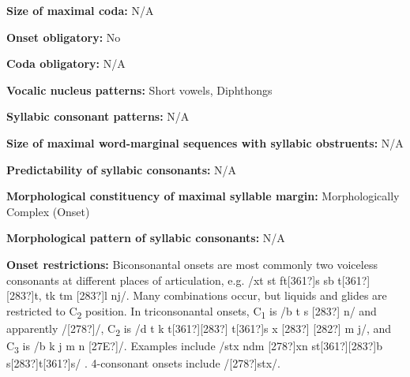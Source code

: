 \begin{styleBody}
\textbf{Size of maximal coda:} N/A
\end{styleBody}

\begin{styleBody}
\textbf{Onset obligatory:} No
\end{styleBody}

\begin{styleBody}
\textbf{Coda obligatory:} N/A
\end{styleBody}

\begin{styleBody}
\textbf{Vocalic nucleus patterns:} Short vowels, Diphthongs
\end{styleBody}

\begin{styleBody}
\textbf{Syllabic consonant patterns:} N/A
\end{styleBody}

\begin{styleBody}
\textbf{Size of maximal word{}-marginal sequences with syllabic obstruents:} N/A
\end{styleBody}

\begin{styleBody}
\textbf{Predictability of syllabic consonants:} N/A
\end{styleBody}

\begin{styleBody}
\textbf{Morphological constituency of maximal syllable margin:} Morphologically Complex (Onset)
\end{styleBody}

\begin{styleBody}
\textbf{Morphological pattern of syllabic consonants:} N/A
\end{styleBody}

\begin{styleBody}
\textbf{Onset restrictions: }Biconsonantal onsets are most commonly two voiceless consonants at different places of articulation, e.g. /xt st ft[361?]s sb t[361?][283?]t, tk tm [283?]l nj/. Many combinations occur, but liquids and glides are restricted to C\textsubscript{2} position. In triconsonantal onsets, C\textsubscript{1} is /b t s [283?] n/ and apparently /[278?]/, C\textsubscript{2} is /d t k t[361?][283?] t[361?]s x [283?] [282?] m j/, and C\textsubscript{3} is /b k j m n [27E?]/. Examples include /stx ndm [278?]xn st[361?][283?]b s[283?]t[361?]s/ . 4-consonant onsets include /[278?]stx/.
\end{styleBody}

